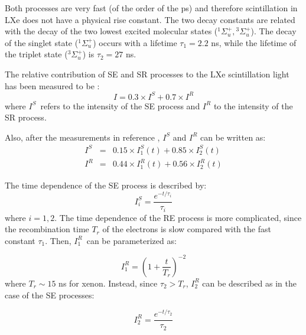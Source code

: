 \documentclass[review]{elsarticle}
\begin{document}
Both processes are very fast (of the order of the ps) and therefore scintillation in LXe does not have a physical rise constant. The two decay constants are related with the decay of the two lowest excited molecular states 
(${}^1{\Sigma_u^+},{}^3{\Sigma_u^+}$). The decay of the singlet state 
(${}^1{\Sigma_u^+}$) occurs with a lifetime $\tau_1 =2.2$ ns, while the lifetime of the triplet state (${}^3{\Sigma_u^+}$) is $\tau_2 =27$ ns.

The relative contribution of SE and SR processes to the LXe scintillation light has been measured to be \cite{Kubota79}:
\begin{equation}
I = 0.3\times I^S + 0.7\times I^R
\end{equation}\label{eq.tot}
%
where $I^S$~refers to the intensity of the SE process and $I^R$ to the intensity of the SR process.

Also, after the measurements in reference \cite{Kubota79}, $I^S$ and $I^R$ can be written as:
\begin{eqnarray}
I^S & = & 0.15\times I_1^S(t) +  0.85\times I_2^S(t) \\
 I^R & = & 0.44\times I_1^R(t) +  0.56\times I_2^R(t)
\end{eqnarray}

The time dependence of the SE process is described by:
\begin{equation}
I^S_i = \frac{e^{-t/\tau_i}}{\tau_i}
\end{equation}
%
where $i=1,2$. The time dependence of the RE process is more complicated, since the recombination time $T_r$
of the electrons is slow compared with the fast constant $\tau_1$. Then, $I^R_1$~can be parameterized \cite{Kubota79} as: 

\begin{equation}
I^R_1 =(1 + \frac{t}{T_r})^{-2}
\end{equation}
%
where $T_r \sim 15$ ns for xenon. Instead, since $\tau_2 > T_r$, $I^R_2$ can be described as in the case of the SE processes: 

\begin{equation}
I^R_2 =\frac{e^{-t/\tau_2}}{\tau_2}
\end{equation}
\end{document}
